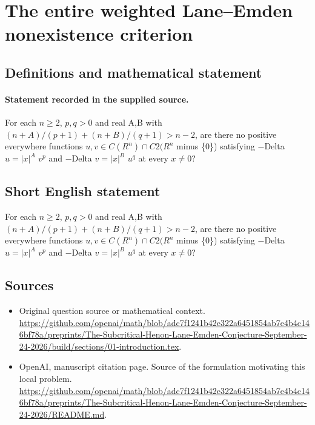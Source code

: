 \documentclass[11pt]{article}
\begin{document}
\section*{The entire weighted Lane–Emden nonexistence criterion}\label{30007327}
\subsection{Definitions and mathematical statement}
\paragraph{Statement recorded in the supplied source.}
For each $n\geq 2$, $p,q>0$ and real A,B with $(n+A)/(p+1)+(n+B)/(q+1)>n-2$, are there no positive everywhere functions $u,v\in C(R^n)\cap C2(R^n$ minus \{0\}) satisfying $-$Delta $u=|x|^A$ $v^p$ and $-$Delta $v=|x|^B$ $u^q$ at every $x\neq 0$?
\subsection{Short English statement}
For each $n\geq 2$, $p,q>0$ and real A,B with $(n+A)/(p+1)+(n+B)/(q+1)>n-2$, are there no positive everywhere functions $u,v\in C(R^n)\cap C2(R^n$ minus \{0\}) satisfying $-$Delta $u=|x|^A$ $v^p$ and $-$Delta $v=|x|^B$ $u^q$ at every $x\neq 0$?
\subsection{Sources}
\begin{itemize}
\item[S1] Original question source or mathematical context.
\url{https://github.com/openai/math/blob/adc7f1241b42e322a6451854ab7e4b4c146bf78a/preprints/The-Subcritical-Henon-Lane-Emden-Conjecture-September-24-2026/build/sections/01-introduction.tex}.
\item[S2] OpenAI, manuscript citation page. Source of the formulation motivating this local problem.
\url{https://github.com/openai/math/blob/adc7f1241b42e322a6451854ab7e4b4c146bf78a/preprints/The-Subcritical-Henon-Lane-Emden-Conjecture-September-24-2026/README.md}.
\end{itemize}
\end{document}
